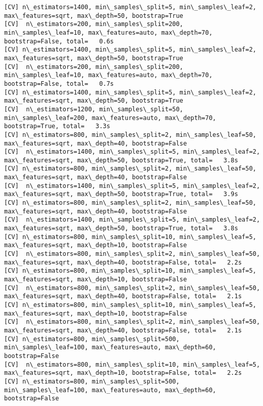 \documentclass[11pt]{article}
\begin{document}
\begin{Verbatim}[commandchars=\\\{\}]
[CV] n\_estimators=1400, min\_samples\_split=5, min\_samples\_leaf=2, max\_features=sqrt, max\_depth=50, bootstrap=True 
[CV]  n\_estimators=200, min\_samples\_split=200, min\_samples\_leaf=10, max\_features=auto, max\_depth=70, bootstrap=False, total=   0.6s
[CV] n\_estimators=1400, min\_samples\_split=5, min\_samples\_leaf=2, max\_features=sqrt, max\_depth=50, bootstrap=True 
[CV]  n\_estimators=200, min\_samples\_split=200, min\_samples\_leaf=10, max\_features=auto, max\_depth=70, bootstrap=False, total=   0.7s
[CV] n\_estimators=1400, min\_samples\_split=5, min\_samples\_leaf=2, max\_features=sqrt, max\_depth=50, bootstrap=True 
[CV]  n\_estimators=1200, min\_samples\_split=50, min\_samples\_leaf=200, max\_features=auto, max\_depth=70, bootstrap=True, total=   3.3s
[CV] n\_estimators=800, min\_samples\_split=2, min\_samples\_leaf=50, max\_features=sqrt, max\_depth=40, bootstrap=False 
[CV]  n\_estimators=1400, min\_samples\_split=5, min\_samples\_leaf=2, max\_features=sqrt, max\_depth=50, bootstrap=True, total=   3.8s
[CV] n\_estimators=800, min\_samples\_split=2, min\_samples\_leaf=50, max\_features=sqrt, max\_depth=40, bootstrap=False 
[CV]  n\_estimators=1400, min\_samples\_split=5, min\_samples\_leaf=2, max\_features=sqrt, max\_depth=50, bootstrap=True, total=   3.9s
[CV] n\_estimators=800, min\_samples\_split=2, min\_samples\_leaf=50, max\_features=sqrt, max\_depth=40, bootstrap=False 
[CV]  n\_estimators=1400, min\_samples\_split=5, min\_samples\_leaf=2, max\_features=sqrt, max\_depth=50, bootstrap=True, total=   3.8s
[CV] n\_estimators=800, min\_samples\_split=10, min\_samples\_leaf=5, max\_features=sqrt, max\_depth=10, bootstrap=False 
[CV]  n\_estimators=800, min\_samples\_split=2, min\_samples\_leaf=50, max\_features=sqrt, max\_depth=40, bootstrap=False, total=   2.2s
[CV] n\_estimators=800, min\_samples\_split=10, min\_samples\_leaf=5, max\_features=sqrt, max\_depth=10, bootstrap=False 
[CV]  n\_estimators=800, min\_samples\_split=2, min\_samples\_leaf=50, max\_features=sqrt, max\_depth=40, bootstrap=False, total=   2.1s
[CV] n\_estimators=800, min\_samples\_split=10, min\_samples\_leaf=5, max\_features=sqrt, max\_depth=10, bootstrap=False 
[CV]  n\_estimators=800, min\_samples\_split=2, min\_samples\_leaf=50, max\_features=sqrt, max\_depth=40, bootstrap=False, total=   2.1s
[CV] n\_estimators=800, min\_samples\_split=500, min\_samples\_leaf=100, max\_features=auto, max\_depth=60, bootstrap=False 
[CV]  n\_estimators=800, min\_samples\_split=10, min\_samples\_leaf=5, max\_features=sqrt, max\_depth=10, bootstrap=False, total=   2.2s
[CV] n\_estimators=800, min\_samples\_split=500, min\_samples\_leaf=100, max\_features=auto, max\_depth=60, bootstrap=False 

\end{Verbatim}
\end{document}

